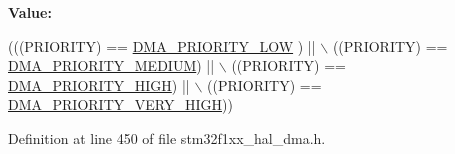 {\bfseries Value\+:}
\begin{DoxyCode}
(((PRIORITY) == \hyperlink{group___d_m_a___priority__level_ga0d1ed2bc9229ba3c953002bcf3a72130}{DMA\_PRIORITY\_LOW} )   || \(\backslash\)
                                   ((PRIORITY) == \hyperlink{group___d_m_a___priority__level_gad6fbeee76fd4a02cbed64365bb4c1781}{DMA\_PRIORITY\_MEDIUM}) || \(\backslash\)
                                   ((PRIORITY) == \hyperlink{group___d_m_a___priority__level_ga6b2f5c5e22895f8b4bd52a27ec6cae2a}{DMA\_PRIORITY\_HIGH})   || \(\backslash\)
                                   ((PRIORITY) == \hyperlink{group___d_m_a___priority__level_gaed0542331a4d875d1d8d5b2878e9372c}{DMA\_PRIORITY\_VERY\_HIGH}))
\end{DoxyCode}


Definition at line 450 of file stm32f1xx\+\_\+hal\+\_\+dma.\+h.

